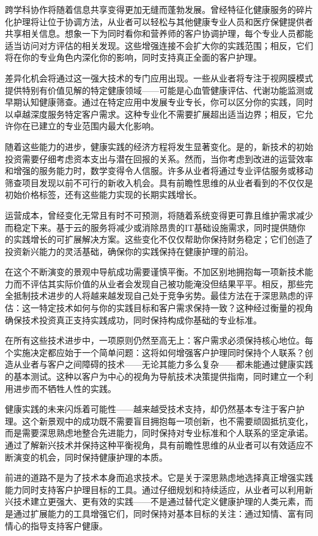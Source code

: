\documentclass[
  Letterpaper,
]{scrbook}
\begin{document}
跨学科协作将随着信息共享变得更加无缝而蓬勃发展。曾经特征化健康服务的碎片化护理将让位于协调方法，从业者可以轻松与其他健康专业人员和医疗保健提供者共享相关信息。想象一下为同时看你和营养师的客户协调护理，每个专业人员都能适当访问对方评估的相关发现。这些增强连接不会扩大你的实践范围；相反，它们将在你的专业角色内深化你的影响，同时支持真正全面的客户护理。

差异化机会将通过这一强大技术的专门应用出现。一些从业者将专注于视网膜模式提供特别有价值见解的特定健康领域------可能是心血管健康评估、代谢功能监测或早期认知健康筛查。通过在特定应用中发展专业专长，你可以区分你的实践，同时以卓越深度服务特定客户需求。这种专业化不需要扩展超出适当边界；相反，它允许你在已建立的专业范围内最大化影响。

随着这些能力的进步，健康实践的经济方程将发生显著变化。是的，新技术的初始投资需要仔细考虑资本支出与潜在回报的关系。然而，当你考虑到改进的运营效率和增强的服务能力时，数学变得令人信服。许多从业者将通过专业评估服务或移动筛查项目发现以前不可行的新收入机会。具有前瞻性思维的从业者看到的不仅仅是初始价格标签，还有这些能力实现的长期实践增长。

运营成本，曾经变化无常且有时不可预测，将随着系统变得更可靠且维护需求减少而稳定下来。基于云的服务将减少或消除昂贵的IT基础设施需求，同时提供随你的实践增长的可扩展解决方案。这些变化不仅仅帮助你保持财务稳定；它们创造了投资新兴能力的灵活基础，确保你的实践保持在健康护理的前沿。

在这个不断演变的景观中导航成功需要谨慎平衡。不加区别地拥抱每一项新技术能力而不评估其实际价值的从业者会发现自己被功能淹没但结果平平。相反，那些完全抵制技术进步的人将越来越发现自己处于竞争劣势。最佳方法在于深思熟虑的评估：这一特定技术如何与你的实践目标和客户需求保持一致？这种经过衡量的视角确保技术投资真正支持实践成功，同时保持构成你基础的专业标准。

在所有这些技术进步中，一项原则仍然至高无上：客户需求必须保持核心地位。每个实施决定都应始于一个简单问题：这将如何增强客户护理同时保持个人联系？创造从业者与客户之间障碍的技术------无论其能力多么复杂------都未能通过健康实践的基本测试。这种以客户为中心的视角为导航技术决策提供指南，同时建立一个利用进步而不牺牲人性的实践。

健康实践的未来闪烁着可能性------越来越受技术支持，却仍然基本专注于客户护理。这个新景观中的成功既不需要盲目拥抱每一项创新，也不需要顽固抵抗变化，而是需要深思熟虑地整合先进能力，同时保持对专业标准和个人联系的坚定承诺。通过了解新兴技术并保持这种平衡视角，具有前瞻性思维的从业者可以有效适应不断演变的机会，同时保持健康护理的本质。

前进的道路不是为了技术本身而追求技术。它是关于深思熟虑地选择真正增强实践能力同时支持客户护理目标的工具。通过仔细规划和持续适应，从业者可以利用新兴技术建立更强大、更有效的实践------不是通过替代定义健康护理的人类元素，而是通过扩展能力的工具增强它们，同时保持对基本目标的关注：通过知情、富有同情心的指导支持客户健康。
\end{document}
